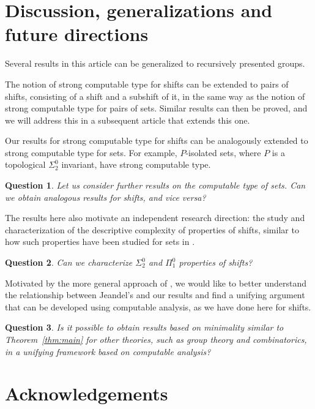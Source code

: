 \documentclass[french,american]{article}
\theoremstyle{plain}
\theoremstyle{definition}
\theoremstyle{remark}
\theoremstyle{plain}
\newtheorem{question}{Question}
\begin{document}
\section{Discussion, generalizations and future directions}\label{sec:Generalization,-conclusion-and}

Several results in this article can be generalized to recursively
presented groups.

The notion of strong computable type for shifts can be extended to
pairs of shifts, consisting of a shift and a subshift of it, in the
same way as the notion of strong computable type for pairs of sets.
Similar results can then be proved, and we will address this in a
subsequent article that extends this one.

Our results for strong computable type for shifts can be analogously
extended to strong computable type for sets. For example, $P$-isolated
sets, where $P$ is a topological $\Sigma_{2}^{0}$ invariant, have
strong computable type.
\begin{question}
Let us consider further results on the computable type of sets. Can
we obtain analogous results for shifts, and vice versa?
\end{question}

The results here also motivate an independent research direction:
the study and characterization of the descriptive complexity of properties
of shifts, similar to how such properties have been studied for sets
in \cite{AH22c,AMIR2025103611}.
\begin{question}
Can we characterize $\Sigma_{2}^{0}$ and $\Pi_{1}^{0}$ properties
of shifts?
\end{question}


Motivated by the more general approach of \cite{jeandel2017enumeration}, we would like to better understand the relationship between Jeandel's and our results and find a unifying argument that can be developed using computable analysis, as we have done here for shifts.

\begin{question}\label{que:quasivar}
Is it possible to obtain results based on minimality similar to Theorem~\ref{thm:main} for other theories, such as group theory and combinatorics, in a unifying framework based on computable analysis?
\end{question}

\section*{Acknowledgements}  
\end{document}
